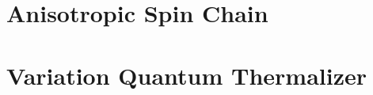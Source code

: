 \documentclass[12pt,twoside]{report}
\begin{document}
  \chapter{Anisotropic Spin Chain}
  \label{chap:main}
  
  \chapter{Variation Quantum Thermalizer}
  \label{chap:vqt}
  
  \printbibliography
\end{document}
